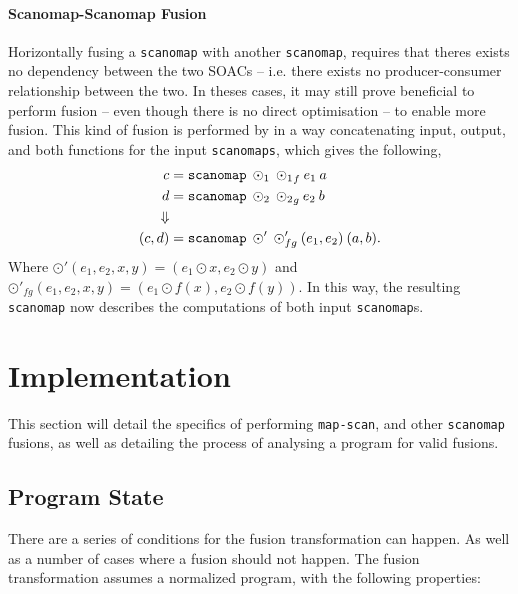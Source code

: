\documentclass[11pt]{article}
\begin{document}
\paragraph{Scanomap-Scanomap Fusion} Horizontally fusing a \texttt{scanomap} with another \texttt{scanomap}, requires that theres exists no dependency between the
 two SOACs -- i.e. there exists no producer-consumer relationship between the two. In theses cases, it may still prove beneficial to perform fusion -- even though there is no direct
 optimisation -- to enable more fusion.
This kind of fusion is performed by in a way concatenating input, output, and both functions for the input \texttt{scanomaps}, which gives the following,
\begin{align*}
  c &= \mathtt{scanomap} \: \odot_1 \: {\odot_1}_f \: e_1 \: a \\
  d &= \mathtt{scanomap} \: \odot_2 \: {\odot_2}_g \: e_2 \: b \\
\Downarrow \\
  (c,d) &= \mathtt{scanomap} \: \odot' \: \odot'_{fg} \: (e_1, e_2) \: (a, b)\mathnormal{.}
\end{align*}
Where $\odot'(e_1,e_2, x, y) = (e_1 \odot x, e_2 \odot y)$ and $\odot'_{fg}(e_1, e_2, x, y) = (e_1 \odot f(x), e_2 \odot f(y))$. In this way, the resulting \texttt{scanomap}
 now describes the computations of both input \texttt{scanomap}s.
\section{Implementation}
This section will detail the specifics of performing \texttt{map-scan}, and other \texttt{scanomap} fusions, as well as detailing the process of
 analysing a program for valid fusions.

\subsection{Program State}
There are a series of conditions for the fusion transformation can happen. As well as a number of cases where a fusion should not happen. The fusion transformation assumes a normalized program, with the following properties: \cite[Figure 5, page 4]{T2Fusion} 
\end{document}
